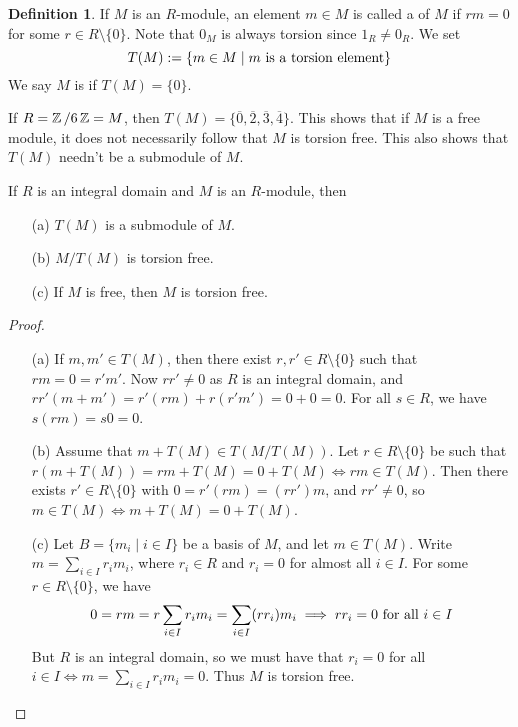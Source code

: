 \documentclass[11pt]{book}
\theoremstyle{definition}   \newtheorem{defn}[counter]{Definition} %
\newcommand{\ov}{\overline}   \newcommand{\wt}{\widetilde}
\newcommand{\bs}{\setminus}   \newcommand{\A}{\mathcal{A}}   \newcommand{\sy}{\textnormal{Syl}}   \newcommand{\size}[1]{\left| #1 \right|}
\newcommand{\vs}{\vspace{8pt}}
\numberwithin{counter}{chapter}
\begin{document}
\vs

\begin{defn}
If $M$ is an $R$-module, an element $m \in M$ is called a  of $M$ if $rm = 0$ for some $r \in R \bs \{0\}$. Note that $0_M$ is always torsion since $1_R \ne 0_R$. We set
	\[ T(M) := \{m \in M \mid m \textnormal{ is a torsion element} \} \]
We say $M$ is  if $T(M) = \{0\}$.
\end{defn}

\vs

\begin{example}
If $R = \operatorname{\mathbb{Z}}/6\operatorname{\mathbb{Z}} = M$, then $T(M) = \{\ov{0},\ov{2},\ov{3},\ov{4}\}$. This shows that if $M$ is a free module, it does not necessarily follow that $M$ is torsion free. This also shows that $T(M)$ needn't be a submodule of $M$.
\end{example}

\vs

\begin{lemma}
If $R$ is an integral domain and $M$ is an $R$-module, then
\begin{enumerate}
\item[(a)] $T(M)$ is a submodule of $M$.
\item[(b)] $M/T(M)$ is torsion free.
\item[(c)] If $M$ is free, then $M$ is torsion free.
\end{enumerate}
\end{lemma}

\vs

\begin{proof}\
\begin{enumerate}
\item[(a)] If $m,m' \in T(M)$, then there exist $r,r' \in R \bs \{0\}$ such that $rm = 0 = r'm'$. Now $rr' \ne 0$ as $R$ is an integral domain, and $rr'(m + m') = r'(rm) + r(r'm') = 0 + 0 = 0$. For all $s \in R$, we have $s(rm) = s 0 = 0$.

\item[(b)] Assume that $m + T(M) \in T(M/T(M))$. Let $r \in R \bs \{0\}$ be such that $r(m + T(M)) = rm + T(M) = 0 + T(M) \iff rm \in T(M)$. Then there exists $r' \in R \bs \{0\}$ with $0 = r'(rm) = (rr')m$, and $rr' \ne 0$, so $m \in T(M) \iff m + T(M) = 0 + T(M)$.

\item[(c)] Let $B = \{m_i \mid i \in I\}$ be a basis of $M$, and let $m \in T(M)$. Write $m = \sum_{i \in I} r_i m_i$, where $r_i \in R$ and $r_i = 0$ for almost all $i \in I$. For some $r \in R \bs \{0\}$, we have
	\[0 = rm = r \sum_{i \in I} r_i m_i = \sum_{i \in I} (rr_i) m_i \implies rr_i = 0 \textnormal{ for all } i \in I \]
But $R$ is an integral domain, so we must have that $r_i = 0$ for all $i \in I \iff m = \sum_{i \in I} r_i m_i = 0$. Thus $M$ is torsion free.
\end{enumerate}
\end{proof}
\end{document}
